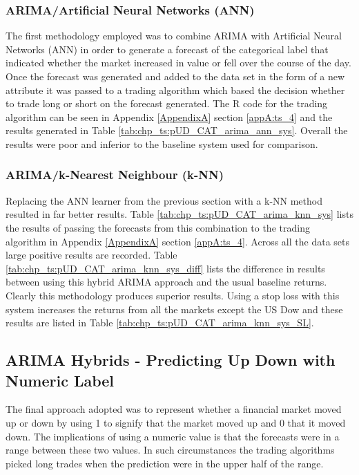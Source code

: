\subsubsection{ARIMA/Artificial Neural Networks (ANN)}
The first methodology employed was to combine ARIMA with Artificial Neural Networks (ANN) in order to generate a forecast of the categorical label that indicated whether the market increased in value or fell over the course of the day. Once the forecast was generated and added to the data set in the form of a new attribute it was passed to a trading algorithm which based the decision whether to trade long or short on the forecast generated. The R code for the trading algorithm can be seen in Appendix \ref{AppendixA} section \ref{appA:ts_4} and the results generated in Table \ref{tab:chp_ts:pUD_CAT_arima_ann_sys}. Overall the results were poor and inferior to the baseline system used for comparison. 

\subsubsection{ARIMA/k-Nearest Neighbour (k-NN)}
Replacing the ANN learner from the previous section with a k-NN method resulted in far better results.  Table \ref{tab:chp_ts:pUD_CAT_arima_knn_sys} lists the results of passing the forecasts from this combination to the trading algorithm in Appendix \ref{AppendixA} section \ref{appA:ts_4}. Across all the data sets large positive results are recorded. Table \ref{tab:chp_ts:pUD_CAT_arima_knn_sys_diff} lists the difference in results between using this hybrid ARIMA approach and the usual baseline returns. Clearly this methodology produces superior results. Using a stop loss with this system increases the returns from all the markets except the US Dow and these results are listed in Table \ref{tab:chp_ts:pUD_CAT_arima_knn_sys_SL}.




\subsection{ARIMA Hybrids - Predicting Up Down with Numeric Label}
The final approach adopted was to represent whether a financial market moved up or down by using 1 to signify that the market moved up and 0 that it moved down. The implications of using a numeric value is that the forecasts were in a range between these two values. In such circumstances the trading algorithms picked long trades when the prediction were in the upper half of the range.

